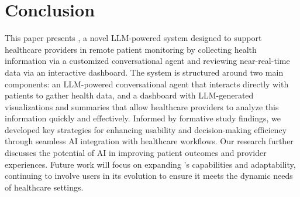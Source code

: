 \section{Conclusion}

This paper presents \projectname{}, a novel LLM-powered system designed to support healthcare providers in remote patient monitoring by collecting health information via a customized conversational agent and reviewing near-real-time data via an interactive dashboard. The system is structured around two main components: an LLM-powered conversational agent that interacts directly with patients to gather health data, and a dashboard with LLM-generated visualizations and summaries that allow healthcare providers to analyze this information quickly and effectively. Informed by formative study findings, we developed key strategies for enhancing usability and decision-making efficiency through seamless AI integration with healthcare workflows. Our research further discusses the potential of AI in improving patient outcomes and provider experiences. Future work will focus on expanding \projectname{}’s capabilities and adaptability, continuing to involve users in its evolution to ensure it meets the dynamic needs of healthcare settings.
